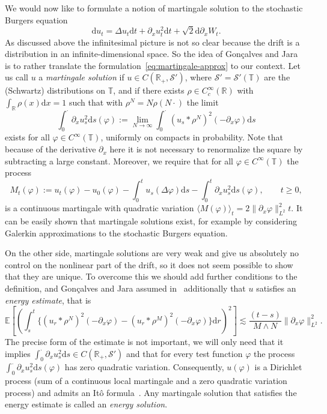 \documentclass[a4paper,11pt]{article}
\newcommand{\assign}{:=}
\newcommand{\cdummy}{\cdot}
\newcommand{\mathd}{\mathrm{d}}
\newcommand{\tmtextit}[1]{{\itshape{#1}}}
\newcommand{\CS}{\mathscr{S}}
\newcommand{\R}{\mathbb{R}}
\newcommand{\T}{\mathbb{T}}
\newcommand{\1}{\mathds{1}}
\newcommand{\dd}{\mathrm{d}}
\begin{document}
We would now like to formulate a notion of martingale solution to the stochastic Burgers equation
\[
   \dd u_t = \Delta u_t \dd t + \partial_x u^2_t \dd t + \sqrt{2} \dd \partial_x W_t.
\]
As discussed above the infinitesimal picture is not so clear because the drift is a distribution in an infinite-dimensional space. So the idea of Gon{\c c}alves and Jara~{\cite{GJ14}} is to rather translate the formulation~\eqref{eq:martingale-approx} to our context. Let us call $u$ a \tmtextit{martingale solution} if $u \in C
(\mathbb{R}_+, \CS')$, where $\CS' = \CS'(\T)$ are the (Schwartz) distributions on $\T$, and if there exists $\rho \in C^\infty_c(\R)$ with
$\int_{\mathbb{R}} \rho (x) \mathd x = 1$ such that with $\rho^N = N \rho (N
\cdummy)$ the limit
\[ \int_0^{\cdummy} \partial_x u_s^2 \mathd s (\varphi) \assign \lim_{N
   \rightarrow \infty} \int_0^{\cdummy} (u_s \ast \rho^N)^2 (- \partial_x
   \varphi) \mathd s \]
exists for all $\varphi \in C^\infty(\T)$, uniformly on compacts in probability. Note that because of the derivative $\partial_x$ here it is not necessary to renormalize the square by subtracting a large constant.
Moreover, we require that for all $\varphi \in C^\infty(\T)$ the process
\begin{equation}\label{eq:martingale}
   M_t (\varphi) \assign u_t (\varphi) - u_0 (\varphi) - \int_0^t u_s (\Delta
   \varphi) \mathd s - \int_0^t \partial_x u_s^2 \mathd s (\varphi), \qquad t
   \geqslant 0,
\end{equation}
is a continuous martingale with quadratic variation $\langle M (\varphi)
\rangle_t = 2 \| \partial_x \varphi \|_{L^2}^2 t$. It can be easily shown that martingale solutions exist, for example by considering Galerkin approximations to the stochastic Burgers equation.

On the other side, martingale solutions are very weak and give us absolutely no control on
the nonlinear part of the drift, so it does not seem possible to show that they are unique. To overcome this we should add further conditions
to the definition, and Gon{\c c}alves and Jara assumed in~{\cite{GJ14}} additionally that $u$ satisfies an \tmtextit{energy
estimate}, that is
\[ \mathbb{E} \left[ \left( \int_s^t \{ (u_r \ast \rho^N)^2 (- \partial_x
   \varphi) - (u_r \ast \rho^M)^2 (- \partial_x \varphi) \} \mathd r \right)^2
   \right] \lesssim \frac{(t - s)}{M \wedge N} \| \partial_x \varphi
   \|_{L^2}^2 . \]
The precise form of the estimate is not important, we will only need that it
implies $\int_0^{\cdummy} \partial_x u_s^2 \mathd s \in C (\mathbb{R}_+,
\CS')$ and that for every test function $\varphi$ the process
$\int_0^{\cdummy} \partial_x u_s^2 \mathd s (\varphi)$ has zero quadratic
variation. Consequently, $u (\varphi)$ is a Dirichlet process (sum of a continuous local martingale and a zero quadratic variation process) and admits an
It{\^o} formula~{\cite{RV}}. Any martingale solution that satisfies the
energy estimate is called an \tmtextit{energy solution}.
\end{document}
